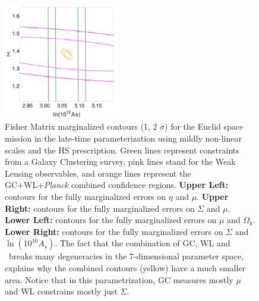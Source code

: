 \begin{figure}[htbp]
\begin{centering}
\includegraphics[width=0.45\textwidth]{Chapters/linear-nonlinear-MG-forecasts/figures/ellipses/DE-related/ellipsesPlot-noLegendManual-MuSigmaFisher-Marged-fiducialMGDE2nonuhs-GC_WL_GC+WL+Planck--nlHS-pars-4-7_-.pdf} 
\end{centering}
\caption[Fisher confidence contours for a Euclid GC and WL forecast.]{\label{fig:DE+Planck-ellipses-mu-sig-eta} 
Fisher Matrix marginalized contours
(1, 2 $\sigma$) for the Euclid space mission in the late-time parameterization
using mildly non-linear scales and the HS prescription. Green lines
represent constraints from a Galaxy Clustering survey, pink lines
stand for the Weak Lensing observables, and orange lines represent the GC+WL+{\it Planck} combined confidence
regions. \textbf{Upper Left: }contours for the fully marginalized
errors on $\eta$ and $\mu$. \textbf{Upper Right: }contours for the
fully marginalized errors on $\Sigma$ and $\mu$.\textbf{ Lower Left:
}contours for the fully marginalized errors on $\mu$ and $\Omega_{b}$.
\textbf{Lower Right: }contours for the fully marginalized errors on
$\Sigma$ and $\ln(10^10 A_{s})$. The fact that the combination of GC, WL and \planck\
breaks many degeneracies in the 7-dimensional parameter space, explains why
the combined contours (yellow) have a much smaller area. Notice that in this parametrization, 
GC measures mostly $\mu$ and WL constrains mostly just $\Sigma$.}
\end{figure}

